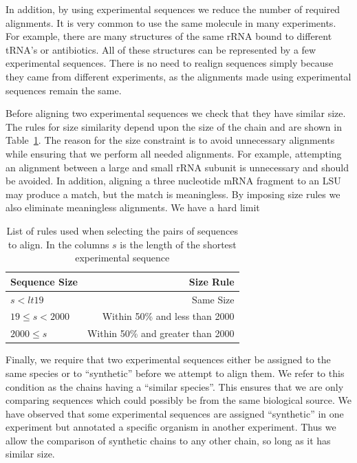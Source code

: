 In addition, by using experimental sequences we reduce the number of required
alignments. It is very common to use the same molecule in many experiments. For
example, there are many structures of the same \EC{} rRNA bound to different
tRNA's or antibiotics. All of these structures can be represented by a few
experimental sequences. There is no need to realign sequences simply because
they came from different experiments, as the alignments made using experimental
sequences remain the same.

Before aligning two experimental sequences we check that they have similar size.
The rules for size similarity depend upon the size of the chain and are shown in
Table~\ref{tab:size-rules}. The reason for the size constraint is to avoid
unnecessary alignments while ensuring that we perform all needed alignments. For
example, attempting an alignment between a large and small rRNA subunit is
unnecessary and should be avoided. In addition, aligning a three nucleotide mRNA
fragment to an LSU may produce a match, but the match is meaningless. By imposing
size rules we also eliminate meaningless alignments. We have a hard limit 

\begin{table}
  \begin{tabular}{lr}
    \toprule
    Sequence Size & Size Rule \\
    \midrule
    $s < lt 19$          & Same Size                         \\
    $19 \leq s < 2000$ & Within 50\% and less than 2000    \\
    $2000 \leq s$        & Within 50\% and greater than 2000 \\
    \bottomrule
  \end{tabular}
  \caption{List of rules used when selecting the pairs of sequences to align. In
  the columns $s$ is the length of the shortest experimental sequence}
  \label{tab:size-rules}
\end{table}

Finally, we require that two experimental sequences either be assigned to the
same species or to ``synthetic'' before we attempt to align them. We refer to
this condition as the chains having a ``similar species''. This ensures that we
are only comparing sequences which could possibly be from the same biological
source. We have observed that some experimental sequences are assigned
``synthetic'' in one experiment but annotated a specific organism in another
experiment. Thus we allow the comparison of synthetic chains to any other chain,
so long as it has similar size. 

